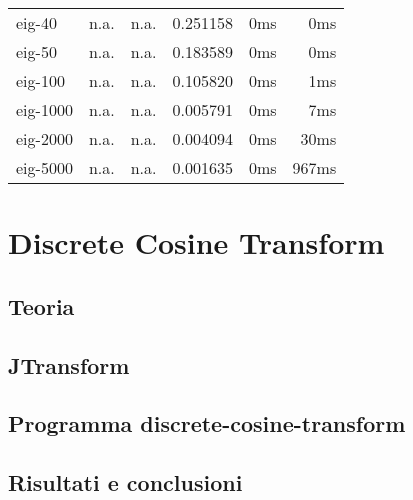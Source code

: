 \documentclass[12pt]{article}
\begin{document}
\begin{table}
\begin{tabular}{|l|r|r|r|r|r|}
      eig-40 &	            n.a. &	              n.a. &           0.251158 & 	0ms		 &			0ms   \\
      eig-50 &	            n.a. &	              n.a. &           0.183589 & 	0ms		 &			0ms   \\
     eig-100 &	            n.a. &	              n.a. &           0.105820 & 	0ms		 &			1ms   \\
    eig-1000 &	            n.a. &	              n.a. &           0.005791 & 	0ms		 &			7ms   \\
    eig-2000 &	            n.a. &	              n.a. &           0.004094 & 	0ms		&			30ms   \\
    eig-5000 &	            n.a. &	              n.a. &           0.001635 &	0ms		&			967ms   \\
\end{tabular}
\end{table}

\section{Discrete Cosine Transform}

\subsection{Teoria}

\subsection{JTransform}

\subsection{Programma discrete-cosine-transform}


\subsection{Risultati e conclusioni}
\end{document}
